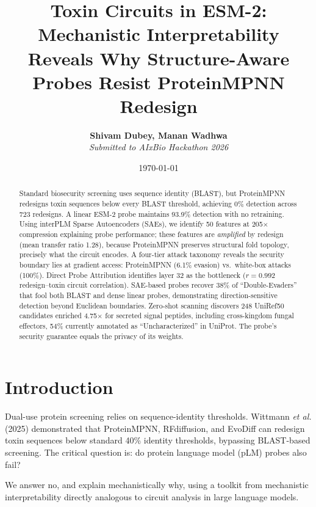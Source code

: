 \documentclass[11pt,a4paper]{article}
\title{\textbf{Toxin Circuits in ESM-2: Mechanistic Interpretability Reveals Why Structure-Aware Probes Resist ProteinMPNN Redesign}}
\author{\textbf{Shivam Dubey, Manan Wadhwa} \\ \textit{Submitted to AIxBio Hackathon 2026}}
\date{\today}
\begin{document}
\maketitle

\begin{abstract}
Standard biosecurity screening uses sequence identity (BLAST), but ProteinMPNN redesigns
toxin sequences below every BLAST threshold, achieving 0\% detection across 723 redesigns.
A linear ESM-2 probe maintains 93.9\% detection with no retraining. Using interPLM Sparse
Autoencoders (SAEs), we identify 50 features at 205$\times$ compression explaining probe
performance; these features are \textit{amplified} by redesign (mean transfer ratio 1.28),
because ProteinMPNN preserves structural fold topology, precisely what the circuit encodes.
A four-tier attack taxonomy reveals the security boundary lies at gradient access:
ProteinMPNN (6.1\% evasion) vs.\ white-box attacks (100\%). Direct Probe Attribution
identifies layer 32 as the bottleneck ($r = 0.992$ redesign--toxin circuit correlation).
SAE-based probes recover 38\% of ``Double-Evaders'' that fool both BLAST and dense linear
probes, demonstrating direction-sensitive detection beyond Euclidean boundaries.
Zero-shot scanning discovers 248 UniRef50 candidates enriched 4.75$\times$ for secreted
signal peptides, including cross-kingdom fungal effectors, 54\% currently annotated as
``Uncharacterized'' in UniProt. The probe's security guarantee equals the privacy of its weights.
\end{abstract}

\section{Introduction}

Dual-use protein screening relies on sequence-identity thresholds. Wittmann \textit{et al.}
(2025) demonstrated that ProteinMPNN, RFdiffusion, and EvoDiff can redesign toxin sequences
below standard 40\% identity thresholds, bypassing BLAST-based screening. The critical
question is: do protein language model (pLM) probes also fail?

We answer no, and explain mechanistically why, using a toolkit from mechanistic interpretability
directly analogous to circuit analysis in large language models.
\end{document}
